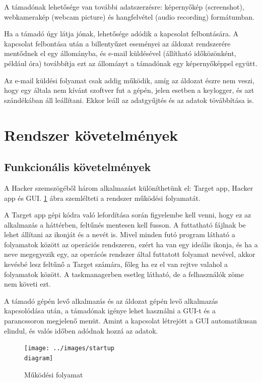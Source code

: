 \documentclass[12pt,a4paper,oneside]{report}
\begin{document}
A támadónak lehetősége van további adatszerzésre: képernyőkép (screenshot), webkamerakép (webcam picture) és hangfelvétel (audio recording) formátumban.

Ha a támadó úgy látja jónak, lehetősége adódik a kapcsolat felbontására. A kapcsolat felbontása után a billentyűzet eseményei az áldozat rendszerére mentődnek el egy állományba, és e-mail küldésével (állítható időközönként, például óra) továbbítja ezt az állományt a támadónak egy képernyőképpel együtt.

Az e-mail küldési folyamat csak addig működik, amíg az áldozat észre nem veszi, hogy egy általa nem kívánt szoftver fut a gépén, jelen esetben a keylogger, és azt szándékában áll leállítani. Ekkor leáll az adatgyűjtés és az adatok tövábbítása is.

\section{Rendszer követelmények}

\subsection{Funkcionális követelmények} %
A Hacker szemszögéből három alkalmazást különíthetünk el: Target app, Hacker app és GUI. \ref{fig:startupdia} ábra szemlélteti a rendszer működési folyamatát.

A Target app gépi kódra való lefordítása során figyelembe kell venni, hogy ez az alkalmazás a háttérben, feltűnés mentesen kell fusson. A futtatható fájlnak be lehet állítani az ikonját és a nevét is. Mivel minden futó program látható a folyamatok között az operációs rendszeren, ezért ha van egy ideális ikonja, és ha a neve megegyezik egy, az operácós rendszer által futtatott folyamat nevével, akkor kevésbé lesz feltűnő a Target számára, főleg ha ez el van rejtve valahol a folyamatok között. A taskmanagerben esetleg látható, de a felhasználók zöme nem követi ezt.

A támadó gépén levő alkalmazás és az áldozat gépén levő alkalmazás kapcsolódása után, a támadónak igénye lehet használni a GUI-t és a parancssoron megjelenő menüt. Amint a kapcsolat létrejött a GUI automatikusan elindul, és valós időben adódnak hozzá az adatok.
\begin{figure}[H]
\centering
\texttt{[image: ../images/startup\\ diagram]}
\caption{Működési folyamat}
\label{fig:startupdia}
\end{figure}
\end{document}
